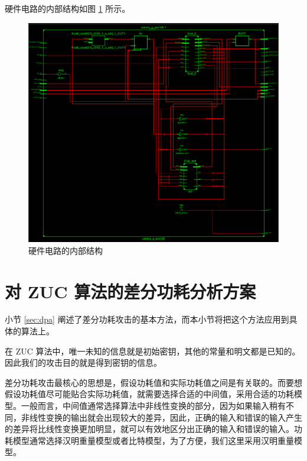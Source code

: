 \newpage

硬件电路的内部结构如图 \ref{fig:circuit_more} 所示。

\begin{figure}[htbp]
    \centering
    \includegraphics[height=.6\textheight]{../images/circuit_more.png}
    \caption{硬件电路的内部结构}
    \label{fig:circuit_more}
\end{figure}

\newpage

\section{对 ZUC 算法的差分功耗分析方案} %
\label{sec:zuc_attack}

小节 \ref{sec:dpa} 阐述了差分功耗攻击的基本方法，而本小节将把这个方法应用到具体的算法上。

在 ZUC 算法中，唯一未知的信息就是初始密钥，其他的常量和明文都是已知的。因此我们的攻击目的就是得到密钥的信息。

差分功耗攻击最核心的思想是，假设功耗值和实际功耗值之间是有关联的。而要想假设功耗值尽可能贴合实际功耗值，就需要选择合适的中间值，采用合适的功耗模型。一般而言，中间值通常选择算法中非线性变换的部分，因为如果输入稍有不同，非线性变换的输出就会出现较大的差异，因此，正确的输入和错误的输入产生的差异将比线性变换更加明显，就可以有效地区分出正确的输入和错误的输入。功耗模型通常选择汉明重量模型或者比特模型，为了方便，我们这里采用汉明重量模型。

\vspace*{\baselineskip}

